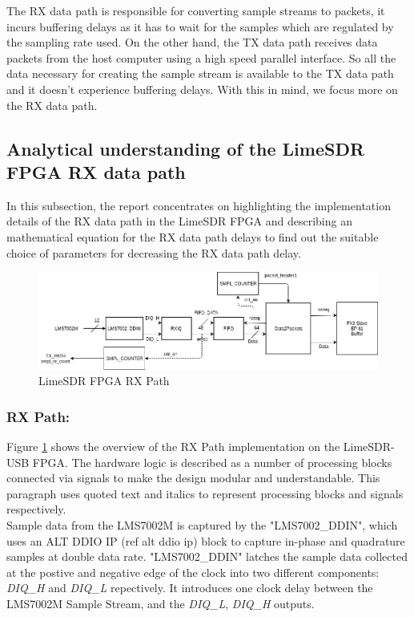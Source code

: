 The RX data path is responsible for converting sample streams to packets, it incurs buffering delays as it has to wait for the samples which are regulated by the sampling rate used.
On the other hand, the TX data path receives data packets from the host computer using a high speed parallel interface.
So all the data necessary for creating the sample stream is available to the TX data path and it doesn't experience buffering delays.
With this in mind, we focus more on the RX data path.


\subsection{Analytical understanding of the LimeSDR FPGA RX data path}
In this subsection, the report concentrates on highlighting the implementation details of the RX data path in the LimeSDR FPGA and describing an mathematical equation for the RX data path delays to find out the suitable choice of parameters for decreasing the RX data path delay.

\begin{figure}[h!]
\centering
\includegraphics[width=\textwidth]{Figure/DATA2PACKETS.png}
\caption{LimeSDR FPGA RX Path}
\label{RX_Path}
\end{figure}

\subsubsection{RX Path:}

Figure \ref{RX_Path} shows the overview of the RX Path implementation on the LimeSDR-USB \ac{FPGA}.
The hardware logic is described as a number of processing blocks connected via signals to make the design modular and understandable.
This paragraph uses quoted text and italics to represent processing blocks and signals respectively.\\

Sample data from the LMS7002M is captured by the "LMS7002\_DDIN", which uses an ALT DDIO IP (ref alt ddio ip) block to capture in-phase and quadrature samples at double data rate.
"LMS7002\_DDIN" latches the sample data collected at the postive and negative edge of the clock into two different components: \textit{DIQ\_H} and \textit{DIQ\_L} repectively.
It introduces one clock delay between the LMS7002M Sample Stream, and the \textit{DIQ\_L}, \textit{DIQ\_H} outputs.\\

